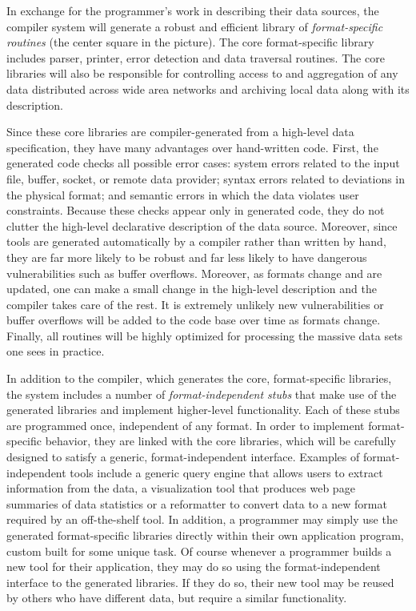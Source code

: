\documentclass[10pt]{article}
\begin{document}
In exchange for the programmer's work in describing their
data sources, the compiler system will generate
a robust and efficient library of {\em format-specific routines} (the center
square in the picture).
The core format-specific 
library includes parser, printer, error detection and data traversal
routines.  The core libraries will also be responsible for controlling
access to and aggregation of any data distributed across wide area
networks and archiving local data along with its description.  

Since these core libraries are compiler-generated from a
high-level data specification, they have many advantages over
hand-written code.  First, the generated code checks
all possible error cases: system errors related to the input file,
buffer, socket, or remote data provider; 
syntax errors related to deviations in the physical
format; and semantic errors in which the data violates user
constraints.  Because these checks appear only in generated code, they
do not clutter the high-level declarative description of the data
source.  Moreover, since tools are generated
automatically by a compiler rather than written by hand, 
they are far more likely to be robust
and far less likely to have dangerous vulnerabilities such as
buffer overflows.  Moreover, as formats change and are updated,
one can make a small change in the high-level description
and the compiler takes care of the rest.  It is extremely unlikely
new vulnerabilities or buffer overflows will be added to the code
base over time as formats change.  Finally, all routines will
be highly optimized for processing the massive
data sets one sees in practice.

In addition to the compiler, which generates the core, format-specific
libraries, the system includes a number of {\em format-independent stubs}
that make use of the generated libraries and implement higher-level
functionality.  Each of these stubs are programmed once, independent
of any format.  In order to implement format-specific behavior, they
are linked with the core libraries, which will be carefully designed to
satisfy a generic, format-independent interface.  Examples of
format-independent tools include a generic query engine that
allows users to extract information from the data, 
a visualization tool that produces
web page summaries of data statistics or a reformatter to convert data
to a new format required by an off-the-shelf tool.  In addition,
a programmer may simply use the generated format-specific libraries directly 
within their own application program, custom built for some unique task. 
Of course whenever a programmer builds a new tool for their application, 
they may do so using the format-independent interface to the generated
libraries.  If they do so, their new tool may be reused by others
who have different data, but require a similar functionality.
\end{document}
